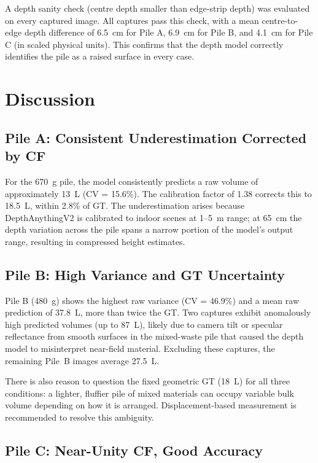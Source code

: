 \documentclass[11pt,a4paper]{article}
\begin{document}
A depth sanity check (centre depth smaller than edge-strip depth) was evaluated on every
captured image. All captures pass this check, with a mean centre-to-edge depth difference
of 6.5~cm for Pile A, 6.9~cm for Pile B, and 4.1~cm for Pile C (in scaled physical units).
This confirms that the depth model correctly identifies the pile as a raised surface in every
case.

\section{Discussion}
\label{sec:discuss}

\subsection{Pile A: Consistent Underestimation Corrected by CF}

For the 670~g pile, the model consistently predicts a raw volume of approximately 13~L
(CV = 15.6\%). The calibration factor of 1.38 corrects this to 18.5~L, within 2.8\% of GT.
The underestimation arises because DepthAnythingV2 is calibrated to indoor scenes at 1--5~m
range; at 65~cm the depth variation across the pile spans a narrow portion of the model's
output range, resulting in compressed height estimates.

\subsection{Pile B: High Variance and GT Uncertainty}

Pile B (480~g) shows the highest raw variance (CV = 46.9\%) and a mean raw prediction of
37.8~L, more than twice the GT. Two captures exhibit anomalously high predicted volumes
(up to 87~L), likely due to camera tilt or specular reflectance from smooth surfaces in
the mixed-waste pile that caused the depth model to misinterpret near-field material.
Excluding these captures, the remaining Pile~B images average 27.5~L.

There is also reason to question the fixed geometric GT (18~L) for all three conditions:
a lighter, fluffier pile of mixed materials can occupy variable bulk volume depending on
how it is arranged. Displacement-based measurement is recommended to resolve this ambiguity.

\subsection{Pile C: Near-Unity CF, Good Accuracy}
\end{document}
